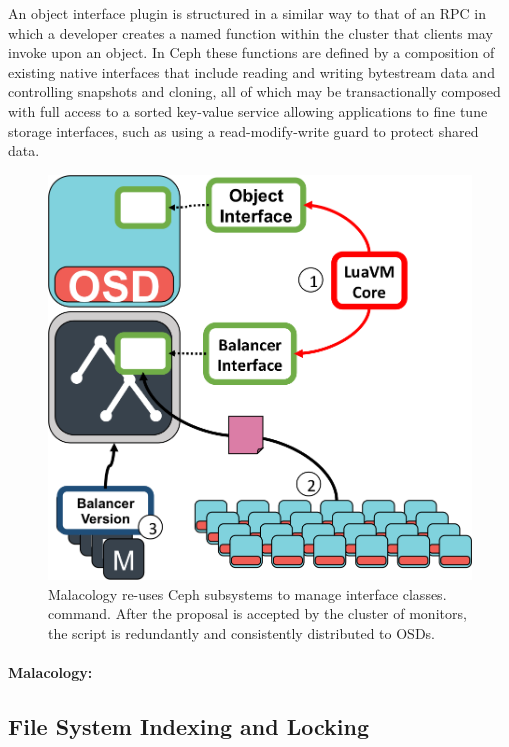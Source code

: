 \documentclass[10pt,twocolumn]{article}
\begin{document}
An object interface plugin is structured in a similar way to that of an RPC in
which a developer creates a named function within the cluster that clients may
invoke upon an object. In Ceph these functions are defined by a composition of
existing native interfaces that include reading and writing bytestream data
and controlling snapshots and cloning, all of which may be transactionally
composed with full access to a sorted key-value service allowing applications
to fine tune storage interfaces, such as using a read-modify-write guard to
protect shared data.

\begin{figure}[htbp]
\centering
\includegraphics{figures/implementation.png}
\caption{Malacology re-uses Ceph subsystems to manage interface classes.
command. After the proposal is accepted by the cluster of monitors, the
script is redundantly and consistently distributed to OSDs.
\label{fig:implementation}}
\end{figure}

\paragraph*{Malacology:} 

\subsection{File System Indexing and Locking}
\end{document}
